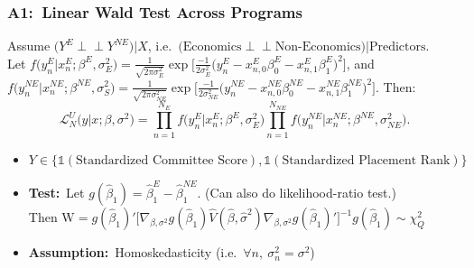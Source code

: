 \documentclass[12pt, aspectratio=169]{beamer}
\newcommand{\indep}{\perp \!\!\! \perp}
\begin{document}
\begin{frame}[label=liwt]
\frametitle{A1:\ Linear Wald Test Across Programs}
Assume $\big(Y^E\indep Y^{NE}\big)\big|X$, i.e.\ $\big(\text{Economics}\indep\text{Non-Economics}\big)\big|\text{Predictors}$. \\
Let $f\big(y_n^E\big|x_n^E;\beta^E,\sigma^2_E\big) = \frac{1}{\sqrt{2\pi\sigma^2_E}}\exp\Big[\frac{-1}{2\sigma^2_E}\big(y_n^E-x_{n,0}^E\beta_0^E-x_{n,1}^E\beta_1^E\big)^2\Big]$, and \\
$f\big(y_n^{NE}\big|x_n^{NE};\beta^{NE},\sigma^2_S\big) = \frac{1}{\sqrt{2\pi\sigma^2_{NE}}}\exp\Big[\frac{-1}{2\sigma^2_{NE}}\big(y_n^{NE}-x_{n,0}^{NE}\beta_0^{NE}-x_{n,1}^{NE}\beta_1^{NE}\big)^2\Big]$. Then:
\begin{equation*}
\mathcal{L}_N^U\big(y\big|x;\beta,\sigma^2\big) = \prod_{n=1}^{N_E}f\big(y_n^E\big|x_n^E;\beta^E,\sigma^2_E\big)\prod_{n=1}^{N_{NE}}f\big(y_n^{NE}\big|x_n^{NE};\beta^{NE},\sigma^2_{NE}\big).
\end{equation*}
\begin{itemize}
\item $Y \in \{\mathds{1}(\text{Standardized Committee Score}), \mathds{1}(\text{Standardized Placement Rank})\}$
\vspace{2.5pt}
\item \textbf{Test:}\ Let $g(\hat\beta_1) = \hat\beta_1^E-\hat\beta_1^{NE}$. (Can also do likelihood-ratio test.) \\ Then $\text{W} = g(\hat\beta_1)'[\nabla_{\beta,\sigma^2} g(\hat\beta_1)\hat V(\hat\beta,\hat\sigma^2)\nabla_{\beta,\sigma^2} g(\hat\beta_1)'\big]^{-1}g(\hat\beta_1)\sim\chi_Q^2$
\vspace{2.5pt}
\item \textbf{Assumption:}\ Homoskedasticity (i.e.\ $\forall n, \: \sigma^2_n=\sigma^2$)
\vspace{2.5pt}
\end{itemize}
\hyperlink{avsa}{}
\end{frame}
\end{document}
